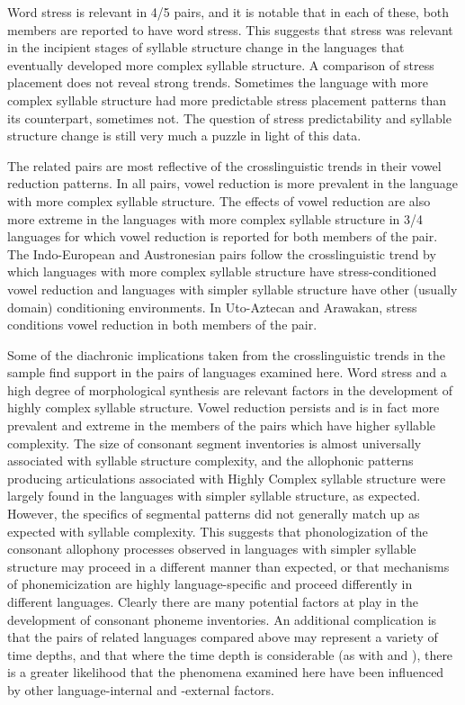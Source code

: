  Word stress is relevant in 4/5 pairs, and it is notable that in each of these, both members are reported to have word stress. This suggests that stress was relevant in the incipient stages of syllable structure change in the languages that eventually developed more complex syllable structure. A comparison of stress placement does not reveal strong trends. Sometimes the language with more complex syllable structure had more predictable stress placement patterns than its counterpart, sometimes not. The question of stress predictability and syllable structure change is still very much a puzzle in light of this data.

  The related pairs are most reflective of the crosslinguistic trends in their vowel reduction patterns. In all pairs, vowel reduction is more prevalent in the language with more complex syllable structure. The effects of vowel reduction are also more extreme in the languages with more complex syllable structure in 3/4 languages for which vowel reduction is reported for both members of the pair. The Indo-European and Austronesian pairs follow the crosslinguistic trend by which languages with more complex syllable structure have stress-conditioned vowel reduction and languages with simpler syllable structure have other (usually domain) conditioning environments. In Uto-Aztecan and Arawakan, stress conditions vowel reduction in both members of the pair.

  Some of the diachronic implications taken from the crosslinguistic trends in the sample find support in the pairs of languages examined here. Word stress and a high degree of morphological synthesis are relevant factors in the development of highly complex syllable structure. Vowel reduction persists and is in fact more prevalent and extreme in the members of the pairs which have higher syllable complexity. The size of consonant segment inventories is almost universally associated with syllable structure complexity, and the allophonic patterns producing articulations associated with Highly Complex syllable structure were largely found in the languages with simpler syllable structure, as expected. However, the specifics of segmental patterns did not generally match up as expected with syllable complexity. This suggests that phonologization of the consonant allophony processes observed in languages with simpler syllable structure may proceed in a different manner than expected, or that mechanisms of phonemicization are highly language-specific and proceed differently in different languages. Clearly there are many potential factors at play in the development of consonant phoneme inventories. An additional complication is that the pairs of related languages compared above may represent a variety of time depths, and that where the time depth is considerable (as with  and ), there is a greater likelihood that the phenomena examined here have been influenced by other language-internal and -external factors.

